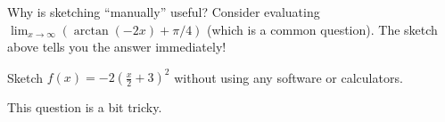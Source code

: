 \documentclass[../main.tex]{subfiles}
\begin{document}
  Why is sketching ``manually'' useful? Consider evaluating \(\lim_{x \to \infty} \left( \arctan(-2x) + \pi/4 \right)\) (which is a common question). The sketch above tells you the answer immediately!
  \clearpage

  \begin{example}
    Sketch \(f(x) = -2\left(\frac{x}{2} + 3\right)^{2}\) without using any software or calculators.

    {\scriptsize This question is a bit tricky.}

  \end{example}
\end{document}
